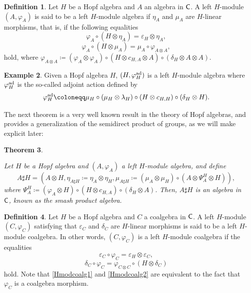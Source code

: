 \documentclass[11pt,reqno]{amsart}
\theoremstyle{plain}%
\newtheorem{theorem}{Theorem}[section]%
\theoremstyle{definition}
\newtheorem{definition}[theorem]{Definition}%
\newtheorem{example}[theorem]{Example}%
\theoremstyle{remark}
\begin{document}
\begin{definition}
Let $H$ be a Hopf algebra and $A$ an algebra in ${\sf C}$. A left $H$-module $(A,\varphi_{A})$ is said to be a left $H$-module algebra if $\eta_{A}$ and $\mu_{A}$ are $H$-linear morphisms, that is, if the following equalities
\begin{equation*}
\label{Hmodalg1}\varphi_{A}\circ(H\otimes\eta_{A})=\varepsilon_{H}\otimes\eta_{A},
\end{equation*}
\begin{equation*}		
\label{Hmodalg2}\varphi_{A}\circ(H\otimes\mu_{A})=\mu_{A}\circ\varphi_{A\otimes A},
\end{equation*} 
hold, where $\varphi_{A\otimes A}\coloneqq(\varphi_{A}\otimes\varphi_{A})\circ(H\otimes c_{H,A}\otimes A)\circ(\delta_{H}\otimes A\otimes A)$.
\end{definition}


\begin{example}
Given a Hopf algebra $H$, $(H,\varphi_{H}^{{\rm ad}})$ is a left $H$-module algebra where $\varphi_{H}^{{\rm ad}}$ is the so-called adjoint action defined by 
\[\varphi_{H}^{{\rm ad}}\coloneqq \mu_{H}\circ(\mu_{H}\otimes\lambda_{H})\circ(H\otimes c_{H,H})\circ(\delta_{H}\otimes H).\]
\end{example}




The next theorem is a very well known result in the theory of Hopf algebras, and provides a generalization of the semidirect product of groups, as we will make explicit later:

\begin{theorem}\label{th-smash}

Let $H$ be a Hopf algebra and $(A, \varphi_A)$ a left $H$-module algebra, and define
\[A\sharp H=(A\otimes H,\eta_{A\sharp H}\coloneqq\eta_{A}\otimes\eta_{H},\mu_{A\sharp H}\coloneqq(\mu_{A}\otimes\mu_{H})\circ (A\otimes \Psi^{H}_{A}\otimes H)),\]
where $\Psi^{H}_{A}\coloneqq (\varphi_{A}\otimes H)\circ(H\otimes c_{H,A})\circ(\delta_{H}\otimes A)$.
Then, $A\sharp H$ is an algebra in ${\sf C}$, known as the smash product algebra. 
\end{theorem}





\begin{definition}
Let $H$ be a Hopf algebra and $C$ a coalgebra in ${\sf C}$. A left $H$-module $(C,\varphi_{C})$ satisfying that $\varepsilon_{C}$ and $\delta_{C}$ are $H$-linear morphisms is said to be a left $H$-module coalgebra. In other words, $(C,\varphi_{C})$ is a left $H$-module coalgebra if the equalities 
\begin{equation}
\label{Hmodcoalg1}\varepsilon_{C}\circ\varphi_{C}=\varepsilon_{H}\otimes\varepsilon_{C},
\end{equation}
\begin{equation}\label{Hmodcoalg2}\delta_{C}\circ\varphi_{C}=\varphi_{C\otimes C}\circ(H\otimes\delta_{C})
\end{equation} 
hold. Note that \eqref{Hmodcoalg1} and \eqref{Hmodcoalg2} are equivalent to the fact that $\varphi_{C}$ is a coalgebra morphism.
\end{definition}
\end{document}

